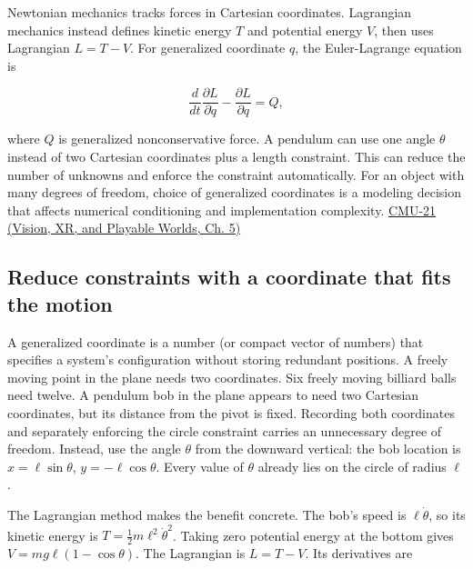 \hypertarget{04-visual-computing-ii-ch029-lagrangian-mechanics-and-generalized-coordinates}{}

Newtonian mechanics tracks forces in Cartesian coordinates. Lagrangian mechanics instead defines kinetic energy \(T\) and potential energy \(V\), then uses Lagrangian \(L=T-V\). For generalized coordinate \(q\), the Euler-Lagrange equation is

\[
\frac{d}{dt}\frac{\partial L}{\partial\dot q}-\frac{\partial L}{\partial q}=Q,
\]

where \(Q\) is generalized nonconservative force. A pendulum can use one angle \(\theta\) instead of two Cartesian coordinates plus a length constraint. This can reduce the number of unknowns and enforce the constraint automatically. For an object with many degrees of freedom, choice of generalized coordinates is a modeling decision that affects numerical conditioning and implementation complexity. \href{../07-Vision-XR-and-Playable-Worlds/main.pdf\#nameddest=04-visual-computing-ii-ch036-cmu-21---dynamics-and-time-integration}{CMU-21 (Vision, XR, and Playable Worlds, Ch. 5)}

\subsection{Reduce constraints with a coordinate that fits the motion}\label{04-visual-computing-ii-ch029-reduce-constraints-with-a-coordinate-that-fits-the-motion}

\hypertarget{04-visual-computing-ii-ch029-reduce-constraints-with-a-coordinate-that-fits-the-motion}{}

A generalized coordinate is a number (or compact vector of numbers) that specifies a system's configuration without storing redundant positions. A freely moving point in the plane needs two coordinates. Six freely moving billiard balls need twelve. A pendulum bob in the plane appears to need two Cartesian coordinates, but its distance from the pivot is fixed. Recording both coordinates and separately enforcing the circle constraint carries an unnecessary degree of freedom. Instead, use the angle \(\theta\) from the downward vertical: the bob location is \(x=\ell\sin\theta\), \(y=-\ell\cos\theta\). Every value of \(\theta\) already lies on the circle of radius \(\ell\).

The Lagrangian method makes the benefit concrete. The bob's speed is \(\ell\dot\theta\), so its kinetic energy is \(T=\tfrac12m\ell^2\dot\theta^2\). Taking zero potential energy at the bottom gives \(V=mg\ell(1-\cos\theta)\). The Lagrangian is \(L=T-V\). Its derivatives are

